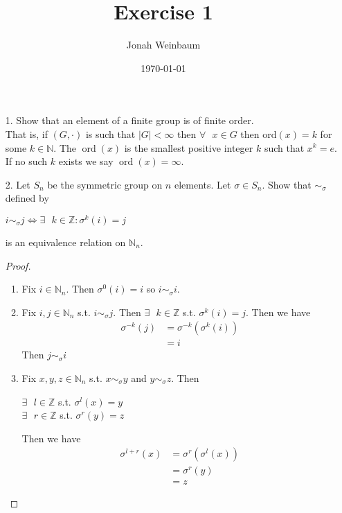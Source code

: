 \documentclass{article}
\begin{document}
\title{Exercise 1}
\author{Jonah Weinbaum}
\date{\today}
\maketitle

\begin{itemize}
    \item [1.] Show that an element of a finite group is of finite order. 
        \\That is, if $(G, \cdot)$ is such that $|G| < \infty$ then $\forall\text{ }x\in{G}$ then $\text{ord}(x) = k$ for some $k\in\mathbb{N}$. The $\operatorname{ord}(x)$ is the smallest positive integer $k$ such that $x^k = e$. If no such $k$ exists we say $\operatorname{ord}(x) = \infty$.
    \item [2.]Let $S_n$ be the symmetric group on $n$ elements. Let $\sigma\in S_n$. Show that $\sim_{\sigma}$ defined by 
    \begin{center}
        $i\sim_\sigma j \iff \exists\text{ }k\in\mathbb{Z}\colon\sigma^k(i)=j$
    \end{center}
    is an equivalence relation on $\mathbb{N}_n$.
    \begin{proof}
      \begin{enumerate}
      \item Fix $i\in\mathbb{N}_n$. Then $\sigma^0(i) = i$ so $i \sim_\sigma i$.
      \item Fix $i,j\in\mathbb{N}_n$ s.t. $i\sim_\sigma j$. Then $\exists\text{ }k\in\mathbb{Z}$ s.t. $\sigma^k(i) = j$. Then we have
        \begin{align*}
          \sigma^{-k}(j) &= \sigma^{-k}(\sigma^k(i)) \\
          &= i
        \end{align*}
        Then $j\sim_\sigma{i}$
      \item Fix $x,y,z \in\mathbb{N}_n$ s.t. $x\sim_\sigma y$ and $y\sim_\sigma z$. Then
        \begin{center}
          $\exists \text{ } l\in\mathbb{Z}$ s.t. $\sigma^l(x) = y$\\
          $\exists \text{ } r\in\mathbb{Z}$ s.t. $\sigma^r(y) = z$
        \end{center}
        Then we have
        \begin{align*}
          \sigma^{l+r}(x) &= \sigma^r(\sigma^l(x))\\
                          &= \sigma^r(y)\\
                          &= z
        \end{align*}

\end{enumerate}
\end{proof}
\end{itemize}
\end{document}
